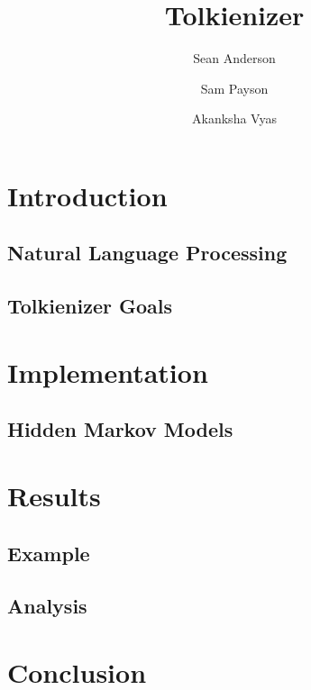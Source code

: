 \documentclass[twocolumn]{article}
\begin{document}
\title{Tolkienizer}
\author{Sean Anderson \and Sam Payson \and Akanksha Vyas}

\section{Introduction}

\subsection{Natural Language Processing}

\subsection{Tolkienizer Goals}

\section{Implementation}

\subsection{Hidden Markov Models}

\section{Results}

\subsection{Example}

\subsection{Analysis}

\section{Conclusion}
\end{document}
